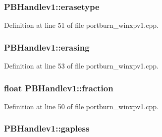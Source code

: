 \subsubsection[{\texorpdfstring{erasetype}{erasetype}}]{ P\+B\+Handlev1\+::erasetype}\hypertarget{struct_p_b_handlev1_ad9be7e9a283d8a47c1192471c90e04d0}{}\label{struct_p_b_handlev1_ad9be7e9a283d8a47c1192471c90e04d0}


Definition at line 51 of file portburn\+\_\+winxpv1.\+cpp.

\subsubsection[{\texorpdfstring{erasing}{erasing}}]{ P\+B\+Handlev1\+::erasing}\hypertarget{struct_p_b_handlev1_a5fdebe4b9efae64d965fc5075f8949ae}{}\label{struct_p_b_handlev1_a5fdebe4b9efae64d965fc5075f8949ae}


Definition at line 53 of file portburn\+\_\+winxpv1.\+cpp.

\subsubsection[{\texorpdfstring{fraction}{fraction}}]{\setlength{\rightskip}{0pt plus 5cm}float P\+B\+Handlev1\+::fraction}\hypertarget{struct_p_b_handlev1_a3cd1d6da80c3cb59614f732e4e7607be}{}\label{struct_p_b_handlev1_a3cd1d6da80c3cb59614f732e4e7607be}


Definition at line 50 of file portburn\+\_\+winxpv1.\+cpp.

\subsubsection[{\texorpdfstring{gapless}{gapless}}]{ P\+B\+Handlev1\+::gapless}\hypertarget{struct_p_b_handlev1_a0ab8c8b42cdee4426700b09da163d0a8}{}\label{struct_p_b_handlev1_a0ab8c8b42cdee4426700b09da163d0a8}


